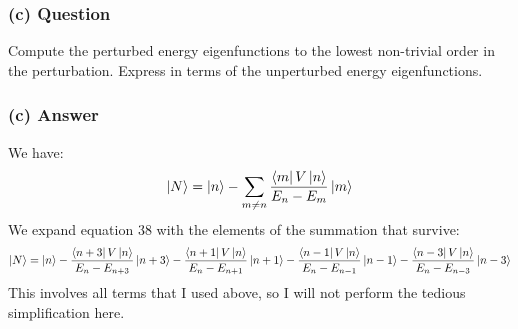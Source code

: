 \documentclass{article}
\begin{document}
\subsubsection*{(c) Question}
Compute the perturbed energy eigenfunctions to the lowest non-trivial order in the perturbation. Express in terms of the unperturbed energy eigenfunctions.

\subsubsection*{(c) Answer}
We have:
\begin{equation}
    \ket{N}= \ket{n} - \sum_{m \neq n} \frac{\bra{m}V\ket{n}}{E_n - E_m} \ket{m}
\end{equation}
We expand equation 38 with the elements of the summation that survive:
\begin{align}
    \ket{N} &= \ket{n} - \frac{\bra{n+3}V\ket{n}}{E_n - E_{n+3}} \ket{n+3} - \frac{\bra{n+1}V\ket{n}}{E_n - E_{n+1}} \ket{n+1} - \frac{\bra{n-1}V\ket{n}}{E_n - E_{n-1}} \ket{n-1} - \frac{\bra{n-3}V\ket{n}}{E_n - E_{n-3}} \ket{n-3} \\
\end{align}
This involves all terms that I used above, so I will not perform the tedious simplification here.
\end{document}
